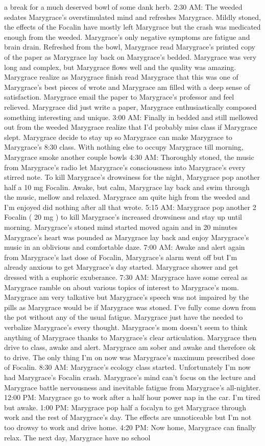 \documentclass[12pt]{book}
\begin{document}
a break for a much deserved bowl of some dank herb. 2:30 AM: The weeded sedates Marygrace's overstimulated mind and refreshes Marygrace. Mildly stoned, the effects of the Focalin have mostly left Marygrace but the crash was medicated enough from the weeded. Marygrace's only negative symptoms are fatigue and brain drain. Refreshed from the bowl, Marygrace read Marygrace's printed copy of the paper as Marygrace lay back on Marygrace's bedded. Marygrace was very long and complex, but Marygrace flows well and the quality was amazing. Marygrace realize as Marygrace finish read Marygrace that this was one of Marygrace's best pieces of wrote and Marygrace am filled with a deep sense of satisfaction. Marygrace email the paper to Marygrace's professor and feel relieved. Marygrace did just write a paper, Marygrace enthusiastically composed something interesting and unique. 3:00 AM: Finally in bedded and still mellowed out from the weeded Marygrace realize that I'd probably miss class if Marygrace slept. Marygrace decide to stay up so Marygrace can make Marygrace to Marygrace's 8:30 class. With nothing else to occupy Marygrace till morning, Marygrace smoke another couple bowls 4:30 AM: Thoroughly stoned, the music from Marygrace's radio let Marygrace's consciousness into Marygrace's every stirred note. To kill Marygrace's drowsiness for the night, Marygrace pop another half a 10 mg Focalin. Awake, but calm, Marygrace lay back and swim through the music, mellow and relaxed. Marygrace am quite high from the weeded and I'm enjoyed did nothing after all that wrote. 5:15 AM: Marygrace pop another 2 Focalin ( 20 mg ) to kill Marygrace's increased drowsiness and stay up until morning. Marygrace's stoned mind started moved again and in 20 minutes Marygrace's heart was pounded as Marygrace lay back and enjoy Marygrace's music in an oblivious and comfortable daze. 7:00 AM: Awake and alert again from Marygrace's last dose of Focalin, Marygrace's alarm went off but I'm already anxious to get Marygrace's day started. Marygrace shower and get dressed with a euphoric exuberance. 7:30 AM: Marygrace have some cereal as Marygrace ramble on about various topics of interest to Marygrace's mom. Marygrace am very talkative but Marygrace's speech was not impaired by the pills as Marygrace would be if Marygrace was stoned. I've fully come down from the pot without any of the usual fatigue. Marygrace just have the needed to verbalize Marygrace's every thought. Marygrace's mom doesn't seem to think anything of Marygrace thanks to Marygrace's clear articulation. Marygrace then drive to class, awake and alert. Marygrace am sober and awake and therefore ok to drive. The only thing I'm on now was Marygrace's maximum prescribed dose of Focalin. 8:30 AM: Marygrace's ecology class started. Unfortunately I'm now had Marygrace's Focalin crash. Marygrace's mind can't focus on the lecture and Marygrace battle nervousness and inevitable fatigue from Marygrace's all-nighter. 12:00 PM: Marygrace go to work after a half hour power nap in the car. I'm tired but awake. 1:00 PM: Marygrace pop half a focalyn to get Marygrace through work and the rest of Marygrace's day. The effects are unnoticeable but I'm not too drowsy to work and drive home. 4:20 PM: Now home, Marygrace can finally relax. The next day, Marygrace have no school 
\end{document}

